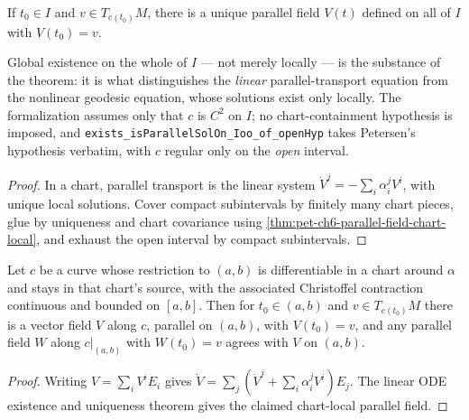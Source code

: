 \begin{theorem}
  \label{thm:pet-ch6-parallel-field-existence-uniqueness}
  \leanok
  If $t_0\in I$ and $v\in T_{c(t_0)}M$, there is a unique parallel field $V(t)$
  defined on all of $I$ with $V(t_0)=v$.

  Global existence on the whole of $I$ — not merely locally — is the substance of
  the theorem: it is what distinguishes the \emph{linear} parallel-transport
  equation from the nonlinear geodesic equation, whose solutions exist only
  locally. The formalization assumes only that $c$ is $C^2$ on $I$; no
  chart-containment hypothesis is imposed, and
  \texttt{exists\_isParallelSolOn\_Ioo\_of\_openHyp} takes Petersen's hypothesis
  verbatim, with $c$ regular only on the \emph{open} interval.
\end{theorem}
\begin{proof}
  \leanok
  \sketch
  In a chart, parallel transport is the linear system \(\dot V^j=-\sum_i\alpha_i^jV^i\), with unique local solutions. Cover compact subintervals by finitely many chart pieces, glue by uniqueness and chart covariance using \cref{thm:pet-ch6-parallel-field-chart-local}, and exhaust the open interval by compact subintervals.
\end{proof}

\begin{theorem}
  \label{thm:pet-ch6-parallel-field-chart-local}
  \leanok
  Let $c$ be a curve whose restriction to $(a,b)$ is differentiable in a chart
  around $\alpha$ and stays in that chart's source, with the associated
  Christoffel contraction continuous and bounded on $[a,b]$. Then for $t_0\in(a,b)$
  and $v\in T_{c(t_0)}M$ there is a vector field $V$ along $c$, parallel on
  $(a,b)$, with $V(t_0)=v$, and any parallel field $W$ along $c|_{(a,b)}$ with
  $W(t_0)=v$ agrees with $V$ on $(a,b)$.
\end{theorem}
\begin{proof}
  \sketch
  Writing \(V=\sum_iV^iE_i\) gives \(\dot V=\sum_j(\dot V^j+\sum_i\alpha_i^jV^i)E_j\). The linear ODE existence and uniqueness theorem gives the claimed chart-local parallel field.
\end{proof}

